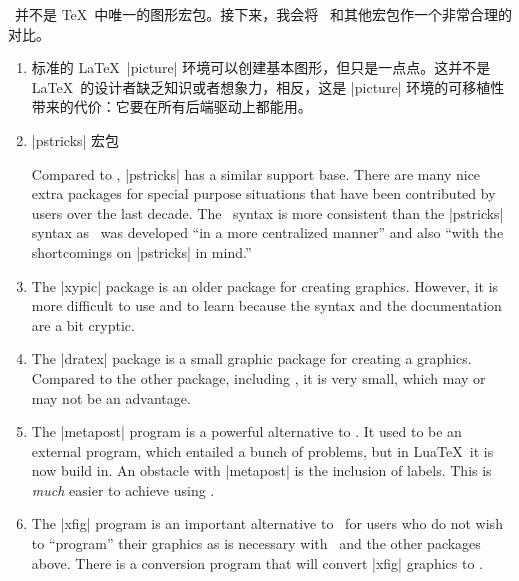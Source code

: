\begin{onehalfspacing}

\tikzname\ 并不是 \TeX\ 中唯一的图形宏包。接下来，我会将 \tikzname\ 和其他宏包作一个非常合理的对比。
\begin{enumerate}
\item 标准的 \LaTeX\ |{picture}| 环境可以创建基本图形，但只是一点点。这并不是 \LaTeX\ 的设计者缺乏知识或者想象力，相反，这是 |{picture}| 环境的可移植性带来的代价：它要在所有后端驱动上都能用。
\item 
|pstricks| 宏包

  Compared to \tikzname, |pstricks| has a similar support base. There
  are many nice extra packages for special purpose situations that have
  been contributed by users over the last decade.
  The \tikzname\ syntax is more consistent than the |pstricks| syntax
  as \tikzname\ was developed ``in a more centralized manner'' and
  also ``with the shortcomings on |pstricks| in mind.''
\item
  The |xypic| package is an older package for creating
  graphics. However, it is more difficult to use and to learn because
  the syntax and the documentation are a bit cryptic.
\item
  The |dratex| package is a small graphic package for creating a
  graphics. Compared to the other package, including \tikzname, it is
  very small, which may or may not be an advantage.
\item
  The |metapost| program is a powerful alternative to
  \tikzname. It used to be an external program, which entailed a
  bunch of problems, but in Lua\TeX\ it is now build in. An obstacle
  with |metapost| is the inclusion of labels. This is \emph{much}
  easier to achieve using \pgfname. 
\item
  The |xfig| program is an important alternative to \tikzname\ for
  users who do not wish to ``program'' their graphics as is necessary
  with \tikzname\ and the other packages above. There is a conversion
  program that will convert |xfig| graphics to \tikzname.
\end{enumerate}

\end{onehalfspacing}

